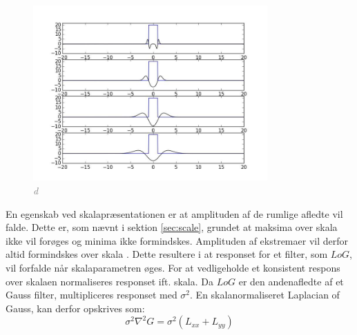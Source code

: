 \begin{figure}[H]
    \centering
    \includegraphics[width=0.80\textwidth]{fig/42.jpg}
    \vspace{-0.5em}
    \begin{center}
    \caption{\textcolor{gray}{\footnotesize \textit{
d   }}}
    \label{fig:laprespons}
     \end{center}
  \end{figure}
       \vspace{-2.7em}
\noindent
En egenskab ved skalapræsentationen er at amplituden af de rumlige afledte vil falde. Dette er, som nævnt i sektion \ref{sec:scale}, grundet at maksima over skala ikke vil forøges og minima ikke formindskes. Amplituden af ekstremaer vil derfor altid formindskes over skala \cite{phdlind}. Dette resultere i at responset for et filter, som $LoG$, vil forfalde når skalaparametren øges. For at vedligeholde et konsistent respons over skalaen  normaliseres responset ift. skala. Da $LoG$ er den andenafledte af et Gauss filter, multipliceres responset med $\sigma^2$. En skalanormaliseret Laplacian of Gauss, kan derfor opskrives som:
$$\sigma^2 \nabla^2G = \sigma^2(L_{xx}+L_{yy})$$